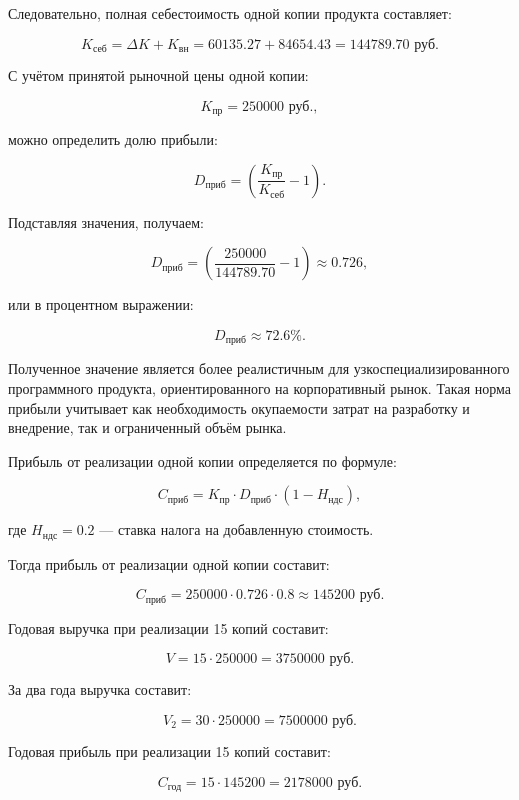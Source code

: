 Следовательно, полная себестоимость одной копии продукта составляет:

\begin{equation}
K_{\text{себ}} = \Delta K + K_{\text{вн}} =
60135.27 + 84654.43 = 144789.70 \text{ руб.}
\end{equation}

С учётом принятой рыночной цены одной копии:

\[
K_{\text{пр}} = 250000 \text{ руб.},
\]

можно определить долю прибыли:

\begin{equation}
D_{\text{приб}} =
\left(\frac{K_{\text{пр}}}{K_{\text{себ}}} - 1\right).
\end{equation}

Подставляя значения, получаем:

\[
D_{\text{приб}} =
\left(\frac{250000}{144789.70} - 1\right) \approx 0.726,
\]

или в процентном выражении:

\[
D_{\text{приб}} \approx 72.6\%.
\]

Полученное значение является более реалистичным для
узкоспециализированного программного продукта, ориентированного на
корпоративный рынок. Такая норма прибыли учитывает как необходимость
окупаемости затрат на разработку и внедрение, так и ограниченный объём
рынка.

Прибыль от реализации одной копии определяется по формуле:

\begin{equation}
C_{\text{приб}} = K_{\text{пр}} \cdot D_{\text{приб}} \cdot
(1 - H_{\text{ндс}}),
\end{equation}

где $H_{\text{ндс}} = 0.2$ --- ставка налога на добавленную стоимость.

Тогда прибыль от реализации одной копии составит:

\[
C_{\text{приб}} =
250000 \cdot 0.726 \cdot 0.8 \approx 145200 \text{ руб.}
\]

Годовая выручка при реализации 15 копий составит:

\[
V = 15 \cdot 250000 = 3750000 \text{ руб.}
\]

За два года выручка составит:

\[
V_2 = 30 \cdot 250000 = 7500000 \text{ руб.}
\]

Годовая прибыль при реализации 15 копий составит:

\[
C_{\text{год}} = 15 \cdot 145200 = 2178000 \text{ руб.}
\]

